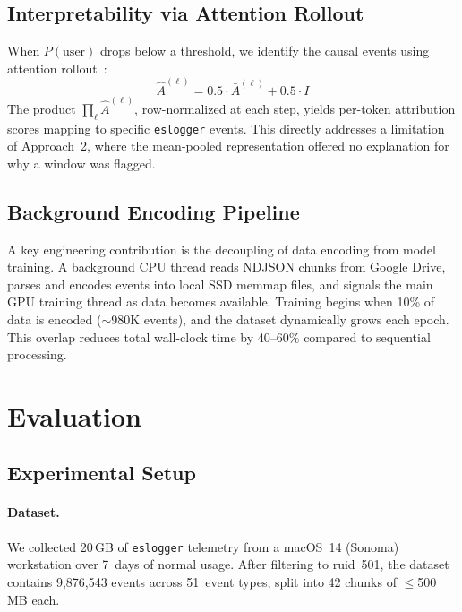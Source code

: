\documentclass[letterpaper,twocolumn,10pt]{article}
\begin{document}
\subsection{Interpretability via Attention Rollout}

When $P(\text{user})$ drops below a threshold, we identify the
causal events using attention rollout~\cite{abnar2020rollout}:
\begin{equation}
\hat{A}^{(\ell)} = 0.5 \cdot \bar{A}^{(\ell)} + 0.5 \cdot I
\end{equation}
The product $\prod_\ell \hat{A}^{(\ell)}$, row-normalized at each
step, yields per-token attribution scores mapping to specific
\texttt{eslogger} events.  This directly addresses a limitation of
Approach~2, where the mean-pooled representation offered no
explanation for why a window was flagged.


\subsection{Background Encoding Pipeline}

A key engineering contribution is the decoupling of data encoding
from model training.  A background CPU thread reads NDJSON chunks
from Google Drive, parses and encodes events into local SSD memmap
files, and signals the main GPU training thread as data becomes
available.  Training begins when 10\% of data is encoded
($\sim$980K events), and the dataset dynamically grows each epoch.
This overlap reduces total wall-clock time by 40--60\% compared to
sequential processing.



\section{Evaluation}
\label{sec:eval}

\subsection{Experimental Setup}

\paragraph{Dataset.}
We collected 20\,GB of \texttt{eslogger} telemetry from a macOS~14
(Sonoma) workstation over 7~days of normal usage.  After filtering
to ruid~501, the dataset contains 9,876,543 events across
51~event types, split into 42 chunks of $\leq$500\,MB each.
\end{document}
